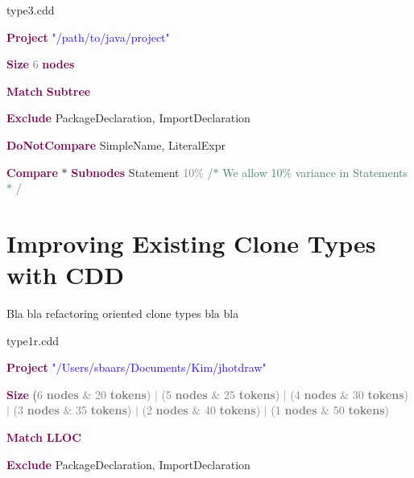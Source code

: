 \documentclass[sigplan,10pt,review,anonymous]{acmart}
\begin{document}
\noindent\makebox[\linewidth]{\rule{\linewidth}{0.4pt}}
\noindent type3.cdd\par
\noindent\makebox[\linewidth]{\rule{\linewidth}{0.4pt}}
\noindent \textbf{\textcolor[HTML]{7F0055}{Project}} \textcolor[HTML]{2A00FF}{"/path/to/java/project"}\par
\noindent \textbf{\textcolor[HTML]{7F0055}{Size}} \textcolor[HTML]{7D7D7D}{6} \textbf{\textcolor[HTML]{7F0055}{nodes}}\par
\noindent \textbf{\textcolor[HTML]{7F0055}{Match}} \textbf{\textcolor[HTML]{7F0055}{Subtree}}\par
\noindent \textbf{\textcolor[HTML]{7F0055}{Exclude}} PackageDeclaration, ImportDeclaration\par
\noindent \textbf{\textcolor[HTML]{7F0055}{DoNotCompare}} SimpleName, LiteralExpr\par
\noindent\textbf{\textcolor[HTML]{7F0055}{Compare}} $\ast$  \textbf{\textcolor[HTML]{7F0055}{Subnodes}} Statement \textcolor[HTML]{7D7D7D}{10$\%$}  \textcolor[HTML]{3F7F5F}{/$\ast$  We allow 10$\%$  variance in Statements $\ast$ /}\par
\noindent\makebox[\linewidth]{\rule{\linewidth}{0.4pt}}

\section{Improving Existing Clone Types with CDD}
Bla bla refactoring oriented clone types bla bla

\vspace{\baselineskip}
type1r.cdd\par

\textbf{\textcolor[HTML]{7F0055}{Project}} \textcolor[HTML]{2A00FF}{"/Users/sbaars/Documents/Kim/jhotdraw"}\par

\textbf{\textcolor[HTML]{7F0055}{Size}} (\textcolor[HTML]{7D7D7D}{6 \textbf{nodes} $\&$  20 \textbf{tokens}) $ \vert $  (5 \textbf{nodes} $\&$  25 \textbf{tokens}) $ \vert $  (4 \textbf{nodes} $\&$  30 \textbf{tokens}) $ \vert $  (3 \textbf{nodes} $\&$  35 \textbf{tokens}) $ \vert $  (2 \textbf{nodes} $\&$  40 \textbf{tokens}) $ \vert $  (1 \textbf{nodes} $\&$  50 \textbf{tokens})}\par

\textbf{\textcolor[HTML]{7F0055}{Match}} \textbf{\textcolor[HTML]{7F0055}{LLOC}}\par

\textbf{\textcolor[HTML]{7F0055}{Exclude}} PackageDeclaration, ImportDeclaration\par
\end{document}
